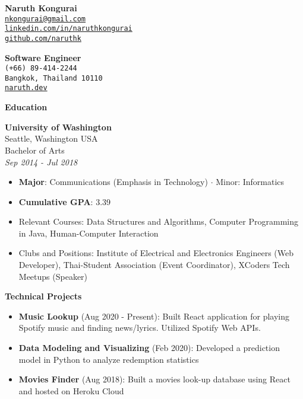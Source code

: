 \documentclass[10pt,a4paper]{article}
\newcommand{\bio}[8]{
  \noindent
  \begin{minipage}[t]{.5\textwidth}
    \textbf{\LARGE #1} \\
    \texttt{#3} \\
    \texttt{#5} \\
    \texttt{#7}
  \end{minipage}%
  \begin{minipage}[t]{.5\textwidth}
    \raggedleft
    \textbf{\large #2} \\
    \texttt{#4} \\
    \texttt{#6} \\
    \texttt{#8}
  \end{minipage}

  \vspace{6pt}
}
\newcommand{\sectionheading}[1]{
  \vspace{14pt}
  \textbf{\Large #1}
  \vspace{6pt}
}
\newcommand{\listitem}[1]{
  \item #1 \vspace{-5pt}
}
\begin{document}
%
%
\bio
{Naruth Kongurai}
{Software Engineer}
{\href{mailto:nkongurai@gmail.com}{nkongurai@gmail.com}}
{(+66) 89-414-2244}
{\href{https://linkedin.com/in/naruthkongurai}{linkedin.com/in/naruthkongurai}}
{Bangkok, Thailand 10110}
{\href{https://github.com/naruthk}{github.com/naruthk}}
{\href{https://www.naruth.dev}{naruth.dev}}

\noindent

%
%
\begin{minipage}[t]{.4\textwidth}
  \raggedright

  \sectionheading{Education}

  \textbf{University of Washington} \\
  Seattle, Washington USA \\
  Bachelor of Arts \\
  \textit{Sep 2014 - Jul 2018}

  \begin{itemize}
    \listitem{\textbf{Major}: Communications (Emphasis in Technology) $\cdot$ Minor: Informatics}
    \listitem{\textbf{Cumulative GPA}: 3.39}
    \listitem{Relevant Courses: Data Structures and Algorithms, Computer Programming in Java, Human-Computer Interaction}
    \listitem{Clubs and Positions: Institute of Electrical and Electronics Engineers
    (Web Developer), Thai-Student Association (Event Coordinator), XCoders Tech Meetups (Speaker)}
  \end{itemize}

  \sectionheading{Technical Projects}

  \begin{itemize}
    \listitem{\textbf{Music Lookup} (Aug 2020 - Present): Built React application for playing
    Spotify music and finding news/lyrics. Utilized Spotify Web APIs.}
  \end{itemize}

  \begin{itemize}
    \listitem{\textbf{Data Modeling and Visualizing} (Feb 2020): Developed a prediction model in Python
    to analyze redemption statistics}
  \end{itemize}

  \begin{itemize}
    \listitem{\textbf{Movies Finder} (Aug 2018): Built a movies look-up database using React and hosted on Heroku Cloud}
  \end{itemize}


\end{minipage}
\end{document}
